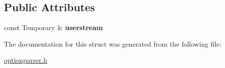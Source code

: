 \subsection*{Public Attributes}
\begin{DoxyCompactItemize}
\item 
\mbox{\label{structoption_1_1_print_usage_implementation_1_1_temporary_writer_a91d54cfcea7bb4072072506d46cc2cc8}} 
const Temporary \& {\bfseries userstream}
\end{DoxyCompactItemize}


The documentation for this struct was generated from the following file\+:\begin{DoxyCompactItemize}
\item 
\hyperlink{optionparser_8h}{optionparser.\+h}\end{DoxyCompactItemize}
